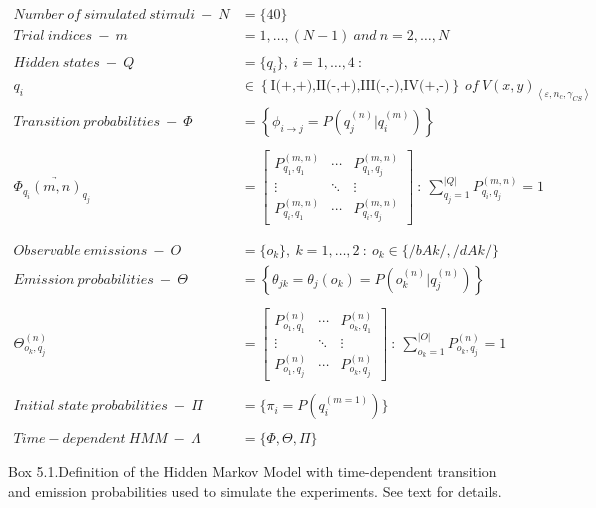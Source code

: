\documentclass[10pt]{article}
\begin{document}
\begin{align*}
\\
\\
Number\ of\ simulated\ stimuli\ -\ N &= \{40\}\\ 
Trial\ indices\ - \ m&=1,\ldots,(N - 1)\ and\ n=2,\ldots,N\\
\\
Hidden\ states\ -\ Q &= \{ q_i \},\ i=1,\ldots,4\ :\\
q_i &\in \left\{ \mbox{I(+,+),II(-,+),III(-,-),IV(+,-)} \right\}\ of\ V(x,y)_{ \left\langle \varepsilon, n_c, \gamma_{CS}\right\rangle }\\
Transition\ probabilities\ -\ \Phi &= \left\{\phi_{i\rightarrow j} = P(q_j^{(n)}\vert q_i^{(m)}) \right\}\\ 
\\
\Phi_{q_i} \underrightarrow{(m,n)}_{q_j} & = \begin{bmatrix} P_{q_1,q_1}^{(m,n)} & \cdots & P_{q_1,q_j}^{(m,n)} \\ \vdots & \ddots & \vdots \\ P_{q_i,q_1}^{(m,n)} & \cdots & P_{q_i,q_j}^{(m,n)} \end{bmatrix}\ :\ \sum_{q_j=1}^{|Q|}P_{q_i,q_j}^{(m,n)}=1\\
\\
\\
Observable\ emissions\ -\ O &= \{o_k\},\ k=1,\ldots,2\ :\ o_k \in \{/bAk/, /dAk/\} \\
Emission\ probabilities\ -\ \Theta &= \left\{\theta_{jk} = \theta_j(o_k) = P(o_k^{(n)} \vert q_j^{(n)}) \right\} \\
\\
\Theta_{o_k,q_j}^{(n)} & =  \begin{bmatrix} P_{o_1,q_1}^{(n)} & \cdots & P_{o_k,q_1}^{(n)} \\ \vdots & \ddots & \vdots \\ P_{o_1,q_j}^{(n)} & \cdots & P_{o_k,q_j}^{(n)} \end{bmatrix}\ :\ \sum_{o_k=1}^{|O|}P_{o_k,q_j}^{(n)}=1\\
\\
Initial\ state\ probabilities\ -\ \Pi &= \{\pi_i = P(q_i^{(m=1)}) \}
\\
\\
Time-dependent\ HMM\ -\ \Lambda &= \{\Phi,\Theta,\Pi\}\\
\\
\end{align*}
Box 5.1.Definition of the Hidden Markov Model with time-dependent transition and emission probabilities used to simulate the experiments. See text for details.
\end{document}
